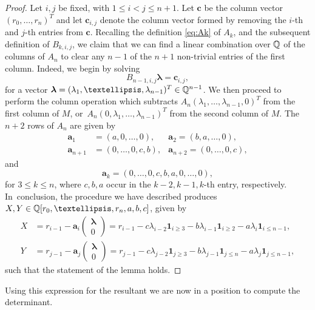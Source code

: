 \documentclass[11pt]{article}
\numberwithin{equation}{section}
\begin{document}
\begin{proof}
Let $i,j$ be fixed, with $1\leq i<j\leq n+1$.
Let $\boldsymbol{c}$ be the column vector $(r_0,\dots, r_n)^T$
and
let $\boldsymbol{c}_{i,j}$ denote the column vector formed by removing the $i$-th and $j$-th entries from $\boldsymbol{c}$.
Recalling the definition \eqref{eq:Ak} of $A_k$, and the subsequent definition of
$B_{k,i,j}$,
we claim that we can find a linear combination over $\mathbb{Q}$ of the columns of $A_n$ to
clear any $n-1$ of the $n+1$ non-trivial entries of the first column.
Indeed, we begin by solving
\[
B_{n-1,i,j}\boldsymbol{\lambda}=\boldsymbol{c}_{i,j},
\]
for a vector $\boldsymbol{\lambda}=(\lambda_1,\dots,\lambda_{n-1})^T\in\Q^{n-1}$.
We then proceed to perform the column operation which subtracts $A_n
(\lambda_1,\dots,\lambda_{n-1},0)^T$
from the first column of $M$, or~$A_n
(0,\lambda_1,\dots,\lambda_{n-1})^T$ from the second
	column of $M$.
The $n+2$ rows of $A_n$ are given by
\begin{align*}
\boldsymbol{a}_1&=(a,0,\dots,0), &\boldsymbol{a}_2=(b,a,\dots,0),\\
\boldsymbol{a}_{n+1}&=(0,\dots ,0,c,b),
&\boldsymbol{a}_{n+2}=(0,\dots ,0,c),
\end{align*}
and
\[
\boldsymbol{a}_{k}=(0,\dots,0,c,b,a,0,\dots,0),
\]
for $3\leq k\leq n$, where $c,b,a$ occur in the $k-2,k-1,k$-th entry, respectively.
In~conclusion, the procedure we have described produces $X,Y\in\Q[r_0,\dots, r_n,a,b,c]$, given by
\begin{align*}
X&=r_{i-1}-\boldsymbol{a}_{i}\begin{pmatrix}\boldsymbol{\lambda}\\ 0\end{pmatrix}
=r_{i-1}-c\lambda_{i-2}\mathbf{1}_{i\geq 3}-b\lambda_{i-1}\mathbf{1}_{i\geq 2}-a\lambda_{i}\mathbf{1}_{i\leq n-1},\\
Y&=r_{j-1}-\boldsymbol{a}_{j}\begin{pmatrix}\boldsymbol{\lambda}\\ 0\end{pmatrix}=r_{j-1}-c\lambda_{j-2}\mathbf{1}_{j\geq 3}-b\lambda_{j-1}\mathbf{1}_{j\leq n}
-a\lambda_j\mathbf{1}_{j\leq n-1},
\end{align*}
such that the statement of the lemma holds.
\end{proof}

Using this expression for the resultant we are now in a position to compute the determinant.
\end{document}
